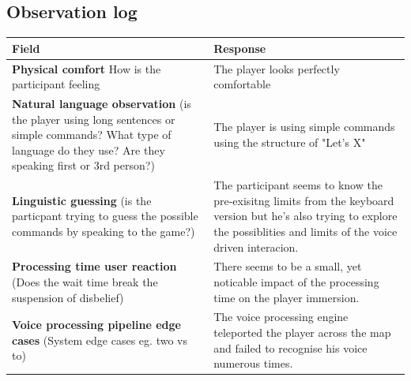 \subsection{Observation log}
\begin{table}[H]
\centering
\begin{tabular}{|p{5cm}|p{10cm}|}
\hline
\textbf{Field} & \textbf{Response} \\ \hline
\textbf{Physical comfort} How is the participant feeling & The player looks perfectly comfortable\\[1.5cm] \hline
\textbf{Natural language observation} (is the player using long sentences or simple commands? What type of language do they use? Are they speaking first or 3rd person?) & The player is using simple commands using the structure of "Let's X"\\[1.5cm] \hline
\textbf{Linguistic guessing} (is the particpant trying to guess the possible commands by speaking to the game?) & The participant seems to know the pre-exisitng limits from the keyboard version but he's also trying to explore the possiblities and limits of the voice driven interacion.\\[1.5cm] \hline
\textbf{Processing time user reaction} (Does the wait time break the suspension of disbelief)& There seems to be a small, yet noticable impact of the processing time on the player immersion.\\[1.5cm] \hline
\textbf{Voice processing pipeline edge cases} (System edge cases eg. two vs to)& The voice processing engine teleported the player across the map and failed to recognise his voice numerous times.\\[1.5cm] \hline
\end{tabular}
\end{table}

